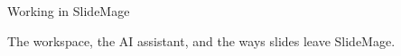 
\begin{sectionframe}{Working in SlideMage}
	\begin{minipage}[t]{0.9\linewidth}\small
		The workspace, the AI assistant, and the ways slides leave SlideMage.
	\end{minipage}\par\smallskip
	\setlength{\SMChapterAgendaMaxHeight}{\dimexpr\paperheight-\SMSectionframeBarBottom-\SMSectionframeContentDrop-\SMContentBottomAlign-14pt-2\baselineskip\relax}%
	\SMChapterAgenda
\end{sectionframe}
